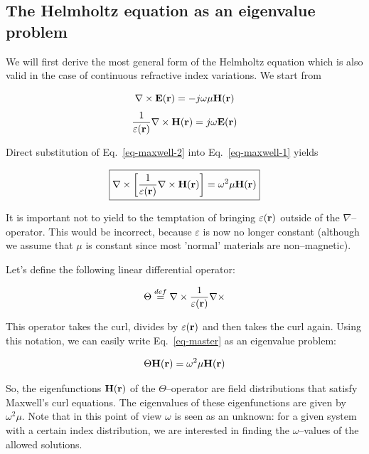 \subsection{The Helmholtz equation as an eigenvalue problem}

We will first derive the most general form of the Helmholtz equation which is also valid in the case of continuous refractive index variations. We start from

\begin{equation}
\nabla \times {\bf E({\bf r})} = - j \omega \mu {\bf H({\bf r})} \label{eq-maxwell-1}
\end{equation}
\begin{equation}   
\frac{1}{\varepsilon({\bf r})}\nabla \times {\bf H({\bf r})} = j \omega {\bf E({\bf r})} \label{eq-maxwell-2}
\end{equation}

Direct substitution of Eq.~\ref{eq-maxwell-2} into Eq.~\ref{eq-maxwell-1} yields

\begin{equation}
\fbox{$\displaystyle
\nabla \times \left[ \frac{1}{\varepsilon({\bf r})}\nabla \times {\bf H({\bf r})}  \right ] = \omega^2 \mu {\bf H({\bf r})} \label{eq-master}
$}
\end{equation} 

It is important not to yield to the temptation of bringing $\varepsilon({\bf r})$  outside of the $\nabla$--operator. This would be incorrect, because $\varepsilon$ is now no longer constant (although we assume that $\mu$ is constant since most 'normal' materials are non--magnetic).

Let's define the following linear differential operator:

\begin{equation}
\Theta \stackrel{def}{=} \nabla \times  \frac{1}{\varepsilon({\bf r})}\nabla \times
\end{equation} 

This operator takes the curl, divides by $\varepsilon({\bf r})$ and then takes the curl again. Using this notation, we can easily write Eq.~\ref{eq-master} as an eigenvalue problem:

\begin{equation}
\Theta {\bf H({\bf r})} = \omega^2 \mu {\bf H({\bf r})}
\end{equation} 

So, the eigenfunctions ${\bf H({\bf r})}$ of the $\Theta$--operator are field distributions that satisfy Maxwell's curl equations. The eigenvalues of these eigenfunctions are given by $\omega^2 \mu$. Note that in this point of view $\omega$ is seen as an unknown: for a given system with a certain index distribution, we are interested in finding the  $\omega$--values of the allowed solutions.

